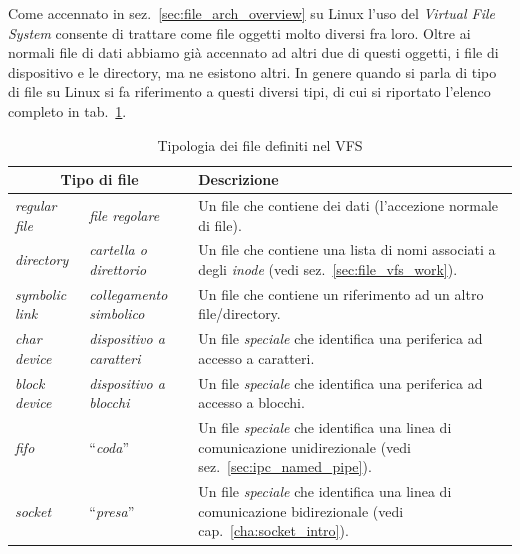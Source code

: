 
Come accennato in sez.~\ref{sec:file_arch_overview} su Linux l'uso del
\textit{Virtual File System} consente di trattare come file oggetti molto
diversi fra loro. Oltre ai normali file di dati abbiamo già accennato ad altri
due di questi oggetti, i file di dispositivo e le directory, ma ne esistono
altri. In genere quando si parla di tipo di file su Linux si fa riferimento a
questi diversi tipi, di cui si riportato l'elenco completo in
tab.~\ref{tab:file_file_types}.

\begin{table}[htb]
  \footnotesize
  \centering
    \begin{tabular}[c]{|l|l|p{6cm}|}
    \hline
    \multicolumn{2}{|c|}{\textbf{Tipo di file}} & \textbf{Descrizione} \\
    \hline
    \hline
      \textit{regular file}& \textsl{file regolare}
                           & Un file che contiene dei dati (l'accezione
                             normale di file).\\
      \textit{directory}   &\textsl{cartella o direttorio}
                           & Un file che contiene una lista di nomi associati
                             a degli \textit{inode} (vedi
                             sez.~\ref{sec:file_vfs_work}).\\   
      \textit{symbolic link}&\textsl{collegamento simbolico}
                           & Un file che contiene un riferimento ad un altro 
                             file/directory.\\ 
      \textit{char device} &\textsl{dispositivo a caratteri} 
                           & Un file \textsl{speciale} che identifica una
                             periferica ad accesso a caratteri.\\
      \textit{block device}& \textsl{dispositivo a blocchi} 
                           & Un file \textsl{speciale} che identifica una
                             periferica ad accesso a blocchi.\\
      \textit{fifo}        & ``\textsl{coda}'' 
                           & Un file \textsl{speciale} che identifica una
                             linea di comunicazione unidirezionale (vedi
                             sez.~\ref{sec:ipc_named_pipe}).\\
      \textit{socket}      & ``\textsl{presa}''
                           & Un file \textsl{speciale} che identifica una
                             linea di comunicazione bidirezionale (vedi
                             cap.~\ref{cha:socket_intro}).\\
    \hline
    \end{tabular}
    \caption{Tipologia dei file definiti nel VFS}
    \label{tab:file_file_types}
\end{table}

